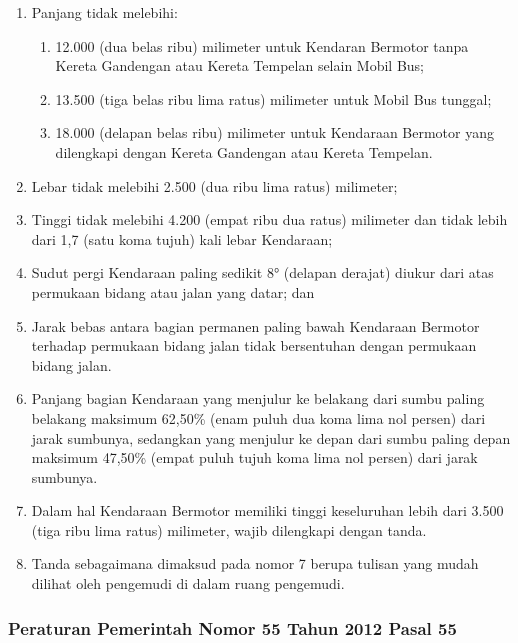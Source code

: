 \begin{enumerate}[nolistsep]
  \item Panjang tidak melebihi:
  \begin{enumerate}[nolistsep]
    \item 12.000 (dua belas ribu) milimeter untuk Kendaran Bermotor tanpa Kereta Gandengan atau Kereta Tempelan selain Mobil Bus;
    \item 13.500 (tiga belas ribu lima ratus) milimeter untuk Mobil Bus tunggal;
    \item 18.000 (delapan belas ribu) milimeter untuk Kendaraan Bermotor yang dilengkapi dengan Kereta Gandengan atau Kereta Tempelan.
  \end{enumerate}
  \item Lebar tidak melebihi 2.500 (dua ribu lima ratus)
  milimeter;
  \item Tinggi tidak melebihi 4.200 (empat ribu dua ratus) milimeter dan tidak lebih dari 1,7 (satu koma tujuh) kali lebar Kendaraan;
  \item Sudut pergi Kendaraan paling sedikit 8° (delapan derajat) diukur dari atas permukaan bidang atau jalan yang datar; dan
  \item Jarak bebas antara bagian permanen paling bawah Kendaraan Bermotor terhadap permukaan bidang jalan tidak bersentuhan dengan permukaan bidang jalan.
  \item Panjang bagian Kendaraan yang menjulur ke belakang dari sumbu paling belakang maksimum 62,50\% (enam puluh dua koma lima nol persen) dari jarak sumbunya, sedangkan yang menjulur ke depan dari sumbu paling depan maksimum 47,50\% (empat puluh tujuh koma lima nol persen) dari jarak sumbunya.
  \item Dalam hal Kendaraan Bermotor memiliki tinggi keseluruhan lebih dari 3.500 (tiga ribu lima ratus) milimeter, wajib dilengkapi dengan tanda.
  \item Tanda sebagaimana dimaksud pada nomor 7 berupa tulisan yang mudah dilihat oleh pengemudi di dalam ruang pengemudi.
\end{enumerate}

\subsubsection{Peraturan Pemerintah Nomor 55 Tahun 2012 Pasal 55}

